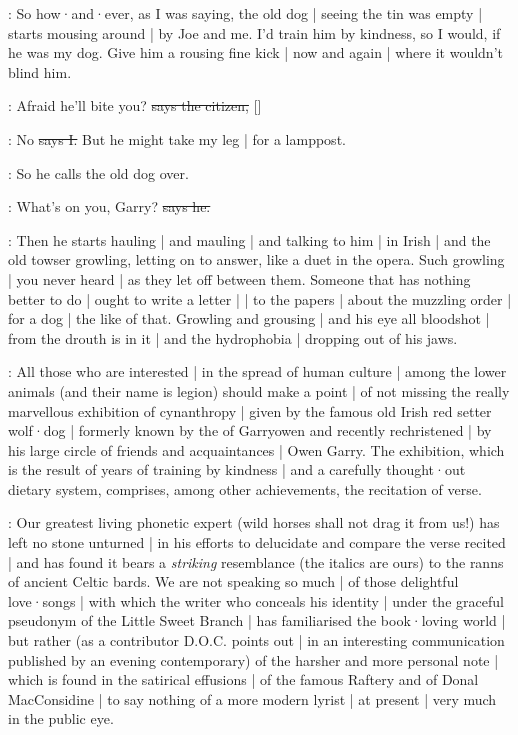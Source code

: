\Nq:
So how·and·ever,
as I was saying,
the old dog |
seeing the tin was empty |
starts mousing around |
by Joe and me.
I'd train him by kindness,
so I would,
if he was my dog.
Give him a rousing fine kick |
now and again |
where it wouldn't blind him.%

\citizen:
Afraid he'll bite you?
\sout{says the citizen,}
[]

:
No
\sout{says I.}
But he might take my leg |
for a lamppost.

\Nq:
So he calls the old dog over.

\citizen:
What's on you,
Garry?
\sout{says he.}

\Nq:
Then he starts hauling |
and mauling |
and talking to him |
in Irish |
and the old towser growling,
letting on to answer,
like a duet in the opera.
Such growling |
you never heard |
as they let off between them.
Someone that has nothing better to do |
ought to write a letter |
 |
to the papers |
about the muzzling order |
for a dog |
the like of that.
Growling and grousing |
and his eye all bloodshot |
from the drouth is in it
 |
and the hydrophobia |
dropping out of his jaws.

:
All those who are interested |
in the spread of human culture |
among the lower animals
(and their name is legion)
should make a point |
of not missing the really marvellous exhibition of cynanthropy |
given by the famous old Irish red setter wolf·dog |
formerly known by the  of Garryowen
and recently rechristened |
by his large circle of friends and acquaintances |
Owen Garry.
The exhibition,
which is the result
of years of training by kindness |
and a carefully thought·out dietary system,
comprises,
among other achievements,
the recitation of verse.

:
Our greatest living phonetic expert
(wild horses shall not drag it from us!)
has left no stone unturned |
in his efforts to delucidate and compare the verse recited |
and has found it bears a \emph{striking} resemblance
(the italics are ours)
to the ranns of ancient Celtic bards.
We are not speaking so much |
of those delightful love·songs |
with which the writer who conceals his identity |
under the graceful pseudonym of the Little Sweet Branch |
has familiarised the book·loving world |
but rather
(as a contributor D.O.C. points out |
in an interesting communication published by an evening contemporary)
of the harsher and more personal note |
which is found in the satirical effusions |
of the famous Raftery
and of Donal MacConsidine |
to say nothing of a more modern lyrist |
at present |
very much in the public eye.%

